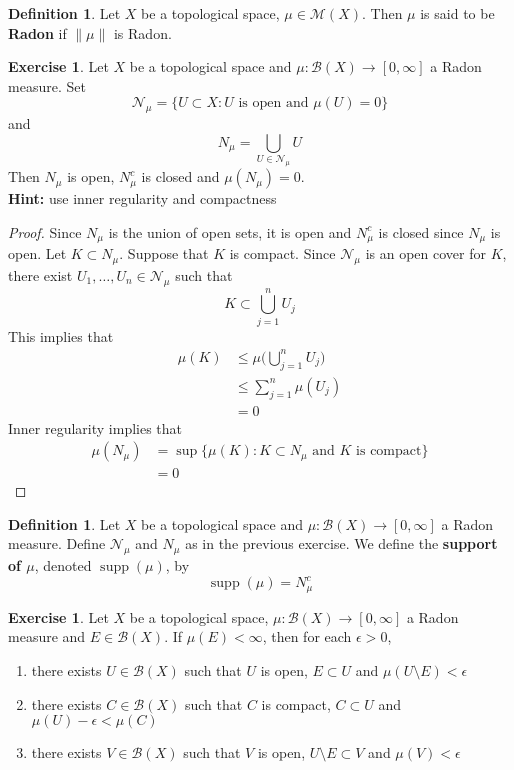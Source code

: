 \documentclass{book}
\theoremstyle{definition}
\newtheorem{defn}[definition]{Definition}
\newtheorem{ex}[definition]{Exercise}
\newcommand{\ep}{\epsilon}
\newcommand{\MB}{\mathcal{B}}
\newcommand{\MM}{\mathcal{M}}
\newcommand{\MN}{\mathcal{N}}
\newcommand{\lex}[1]{\label{ex:#1}}
\newcommand{\ld}[1]{\label{defn:#1}}
\DeclareMathOperator{\supp}{supp}
\DeclareMathOperator*{\0}{\mbf{0}}
\DeclareMathOperator*{\1}{\mbf{1}}
\newcommand{\RG}{[0,\infty]}
\begin{document}
	\begin{defn}
		Let $X$ be a topological space, $\mu \in \MM(X)$. Then $\mu$ is said to be \textbf{Radon} if $\|\mu\|$ is Radon.  
	\end{defn}
	
	\begin{ex} \lex{00000} 
	Let $X$ be a topological space and $\mu: \MB(X) \rightarrow \RG$ a Radon measure. Set $$\MN_{\mu} = \{U \subset X: U \text{ is open and } \mu(U) = 0\}$$ and $$N_{\mu} = \bigcup_{U \in \MN_{\mu}} U$$ 
	Then $N_{\mu}$ is open, $N_{\mu}^c$ is closed and $\mu(N_{\mu}) = 0$.\\
	\textbf{Hint:} use inner regularity and compactness
	\end{ex}
	
	\begin{proof}
	Since $N_{\mu}$ is the union of open sets, it is open and $N_{\mu}^c$ is closed since $N_{\mu}$ is open. Let $K \subset N_{\mu}$. Suppose that $K$ is compact. Since $\MN_{\mu}$ is an open cover for $K$, there exist $U_1, \ldots, U_n \in \MN_{\mu}$ such that $$K \subset \bigcup_{j=1}^n U_j$$ 
	This implies that 
	\begin{align*}
	\mu(K) 
	&\leq \mu\bigg( \bigcup_{j=1}^n U_j \bigg) \\
	& \leq \sum_{j=1}^n \mu(U_j) \\
	&= 0
	\end{align*}
	Inner regularity implies that 
	\begin{align*}
	\mu(N_{\mu}) 
	&= \sup \{ \mu(K): K \subset N_{\mu} \text{ and $K$ is compact}\} \\
	&= 0
	\end{align*}
	\end{proof}
	
	\begin{defn} \ld{00000} 
	Let $X$ be a topological space and $\mu: \MB(X) \rightarrow \RG$ a Radon measure. Define $\MN_{\mu}$ and $N_{\mu}$ as in the previous exercise. We define the \textbf{support of $\mu$}, denoted $\supp(\mu)$, by $$\supp(\mu) = N_{\mu}^c $$
	\end{defn}
	
	\begin{ex} \lex{00000} 
	Let $X$ be a topological space, $\mu: \MB(X) \rightarrow \RG$ a Radon measure and $E \in \MB(X)$. If $\mu(E) < \infty$, then for each $\ep >0$, 
	\begin{enumerate}
	\item there exists $U \in \MB(X)$ such that $U$ is open, $E \subset U$ and $\mu(U \setminus E) < \ep$ 
	\item there exists $C \in \MB(X)$ such that $C$ is compact, $C \subset U$ and $\mu(U) - \ep < \mu(C)$ 
	\item there exists $V \in \MB(X)$ such that $V$ is open, $U \setminus E \subset V$ and $\mu(V) < \ep$ 
	\end{enumerate}
	\end{ex}
	
\end{document}
